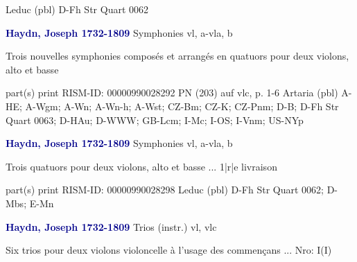 \documentclass[twocolumn]{book}
\begin{document}
\newline Leduc  (pbl)
\newline D-Fh  Str Quart 0062
\newline \par \vspace{7pt} \textcolor{darkblue}{\textbf{Haydn, Joseph  1732-1809}}
\newline Symphonies    
 vl, a-vla, b
\newline \begin{itshape}Trois nouvelles symphonies composés et arrangés en quatuors pour deux violons, alto et basse\end{itshape} 
\newline \textcolor{darkblue}{}  part(s)  
\newline print
\newline RISM-ID: 00000990028292
\newline PN (203) auf vlc, p. 1-6
\newline Artaria  (pbl)
\newline A-HE; A-Wgm; A-Wn; A-Wn-h; A-Wst; CZ-Bm; CZ-K; CZ-Pnm; D-B; D-Fh  Str Quart 0063; D-HAu; D-WWW; GB-Lcm; I-Mc; I-OS; I-Vnm; US-NYp
\newline \par \vspace{7pt} \textcolor{darkblue}{\textbf{Haydn, Joseph  1732-1809}}
\newline Symphonies    
 vl, a-vla, b
\newline \begin{itshape}Trois quatuors pour deux violons, alto et basse ... 1|r|e livraison\end{itshape} 
\newline \textcolor{darkblue}{}  part(s)  
\newline print
\newline RISM-ID: 00000990028298
\newline Leduc  (pbl)
\newline D-Fh  Str Quart 0062; D-Mbs; E-Mn
\newline \par \vspace{7pt} \textcolor{darkblue}{\textbf{Haydn, Joseph  1732-1809}}
\newline Trios (instr.)    
 vl, vlc
\newline \begin{itshape}Six trios pour deux violons  violoncelle à l'usage des commençans ... Nro: I(I)\end{itshape} 
\end{document}

